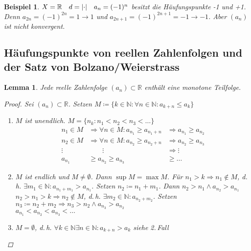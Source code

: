 \documentclass[ngerman,titlepage,twoside, parskip=half*]{scrreprt}
\newcommand*{\N}{\mathbb{N}}
\newcommand*{\R}{\mathbb{R}}
\theoremstyle{break}
\newtheorem{lemma}{Lemma}
\theoremstyle{nonumberbreak}
\newtheorem{beispiel}{Beispiel}
\newtheorem{proof}{Beweis:}
\DeclarePairedDelimiter{\abs}{\lvert}{\rvert}
\begin{document}
\begin{beispiel}
  $X=\R \quad d=\abs{\cdot} \quad a_n=(-1)^n$ besitzt die Häufungspunkte -1
  und +1. Denn $a_{2n}=(-1)^{2n}=1\rightarrow 1$ und
  $a_{2n+1}=(-1)^{2n+1}=-1\rightarrow -1$. Aber $(a_n)$ ist 
  nicht konvergent. 
\end{beispiel}

\subsection[Häufungspunkte von reellen Zahlenfolgen und der Satz von Bolzano/Weierstrass]{Häufungspunkte von reellen Zahlenfolgen und der Satz von Bolzano/Weierstrass}
\begin{lemma}
\label{lemma:bw}
Jede reelle Zahlenfolge $(a_n) \subset \R$ enthält eine monotone Teilfolge.
\begin{proof}
  Sei $(a_n) \subset \R$. Setzen $M\coloneqq\{k \in \N \colon \forall n \in \N
  \colon a_{k+n}\leq a_k\}$
  \begin{enumerate}[1.\,F{a}ll]
  \item $M$ ist unendlich. $M=\{n_k\colon n_1<n_2<n_3<\ldots\}$
    \begin{align*}
      n_1 \in M & \Rightarrow \forall n \in M\colon a_{n_1}\geq a_{n_1+n} &
      \Rightarrow a_{n_1} \geq a_{n_2}\\
      n_2 \in M & \Rightarrow \forall n \in M\colon a_{n_2}\geq a_{n_2+n} &
      \Rightarrow a_{n_2} \geq a_{n_3}\\
      \vdots &\qquad \vdots & \Rightarrow \vdots\\
      a_{n_1} &\geq a_{n_2}\geq a_{n_3} &\geq \ldots
    \end{align*}
  \item $M$ ist endlich und $M \neq \emptyset$. Dann $\sup M = \max
    M$. Für $n_1>k \Rightarrow n_1 \notin M$, d.\,h.
    $\exists m_1 \in \N \colon a_{n_1+m_1}>a_{n_1}$. Setzen $n_2 \coloneqq n_1
    +m_1$. Dann $n_2>n_1 \wedge a_{n_2} > a_{n_1}$\\
    $n_2>n_1>k \Rightarrow n_2 \notin M$, d.\,h. $\exists m_2 \in \N \colon
    a_{n_2+m_2}$. Setzen $n_3\coloneqq n_2+m_2 \Rightarrow
    n_3>n_2 \wedge a_{n_3}>a_{n_2}$\\
    $a_{n_1}<a_{n_2}<a_{n_3}<\ldots$
  \item $M=\emptyset$, d.\,h. $\forall k \in \N \exists n \in \N \colon
    a_{k+n}>a_k$ siehe 2.\,Fall
\end{enumerate}
\end{proof}
\end{lemma}
\end{document}
